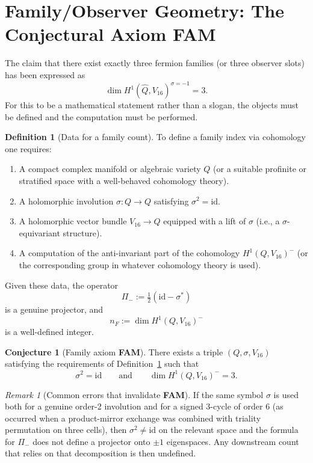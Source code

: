 \documentclass[11pt]{article}
\theoremstyle{plain}
\theoremstyle{definition}
\newtheorem{definition}[theorem]{Definition}
\newtheorem{conjecture}[theorem]{Conjecture}
\theoremstyle{remark}
\newtheorem{remark}[theorem]{Remark}
\numberwithin{equation}{section}
\newcommand{\id}{\mathrm{id}}
\begin{document}
\section{Family/Observer Geometry: The Conjectural Axiom \textbf{FAM}}
\label{sec:fam}

The claim that there exist exactly three fermion families (or three observer slots) has been expressed as
\[
\dim H^1(\hat Q,V_{16})^{\sigma=-1}=3.
\]
For this to be a mathematical statement rather than a slogan, the objects must be defined and the computation must be performed.

\begin{definition}[Data for a family count]\label{def:fam-data}
To define a family index via cohomology one requires:
\begin{enumerate}[label=(\roman*)]
\item A compact complex manifold or algebraic variety $Q$ (or a suitable profinite or stratified space with a well-behaved cohomology theory).
\item A holomorphic involution $\sigma:Q\to Q$ satisfying $\sigma^2=\id$.
\item A holomorphic vector bundle $V_{16}\to Q$ equipped with a lift of $\sigma$ (i.e., a $\sigma$-equivariant structure).
\item A computation of the anti-invariant part of the cohomology $H^1(Q,V_{16})^{-}$ (or the corresponding group in whatever cohomology theory is used).
\end{enumerate}
Given these data, the operator
\[
\Pi_- := \tfrac12(\id - \sigma^*)
\]
is a genuine projector, and
\[
n_F := \dim H^1(Q,V_{16})^{-}
\]
is a well-defined integer.
\end{definition}

\begin{conjecture}[Family axiom \textbf{FAM}]\label{conj:fam}
There exists a triple $(Q,\sigma,V_{16})$ satisfying the requirements of Definition~\ref{def:fam-data} such that
\[
\sigma^2 = \id \qquad\text{and}\qquad \dim H^1(Q,V_{16})^{-} = 3.
\]
\end{conjecture}

\begin{remark}[Common errors that invalidate \textbf{FAM}]
If the same symbol $\sigma$ is used both for a genuine order-2 involution and for a signed 3-cycle of order 6 (as occurred when a product-mirror exchange was combined with triality permutation on three cells), then $\sigma^2\neq\id$ on the relevant space and the formula for $\Pi_-$ does not define a projector onto $\pm 1$ eigenspaces. Any downstream count that relies on that decomposition is then undefined.
\end{remark}
\end{document}
